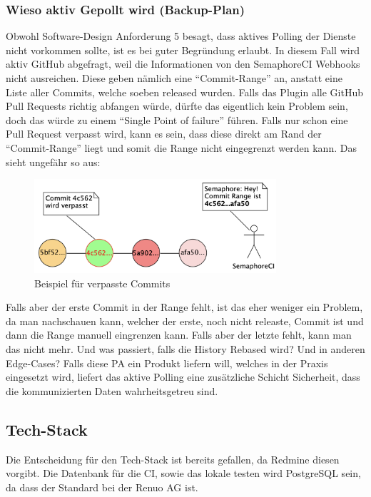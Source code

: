 \subsubsection{Wieso aktiv Gepollt wird (Backup-Plan)}
\label{sec:why_active_polling}
Obwohl Software-Design Anforderung 5 besagt, dass aktives Polling der Dienste nicht vorkommen sollte, ist
es bei guter Begründung erlaubt. In diesem Fall wird aktiv GitHub abgefragt, weil die Informationen von
den SemaphoreCI Webhooks nicht ausreichen. Diese geben nämlich eine \enquote{Commit-Range} an, anstatt
eine Liste aller Commits, welche soeben released wurden. \newline
Falls das Plugin alle GitHub Pull Requests richtig abfangen würde, dürfte das eigentlich kein Problem sein,
doch das würde zu einem \enquote{Single Point of failure} führen. Falls nur schon eine Pull Request verpasst
wird, kann es sein, dass diese direkt am Rand der \enquote{Commit-Range} liegt und somit die Range nicht
eingegrenzt werden kann. Das sieht ungefähr so aus:
\begin{figure}[H]
  \centering
  \includegraphics[width=0.8\textwidth]{images/misc/missed_commit_range.png}
  \caption[UMLet Diagramm eines Beispiels für verpasste Commits]{Beispiel für verpasste Commits}
  \label{fig:commit_range}
\end{figure}
Falls aber der erste Commit in der Range fehlt, ist das eher weniger ein Problem, da man nachschauen
kann, welcher der erste, noch nicht releaste, Commit ist und dann die Range manuell eingrenzen kann. \newline
Falls aber der letzte fehlt, kann man das nicht mehr. Und was passiert, falls die History Rebased wird?
Und in anderen Edge-Cases? Falls diese PA ein Produkt liefern will, welches in der Praxis eingesetzt wird,
liefert das aktive Polling eine zusätzliche Schicht Sicherheit, dass die kommunizierten Daten wahrheitsgetreu
sind.

\subsection{Tech-Stack}
Die Entscheidung für den Tech-Stack ist bereits gefallen, da Redmine diesen vorgibt. \newline
Die Datenbank für die CI, sowie das lokale testen wird PostgreSQL sein, da dass der Standard bei der Renuo AG ist.

